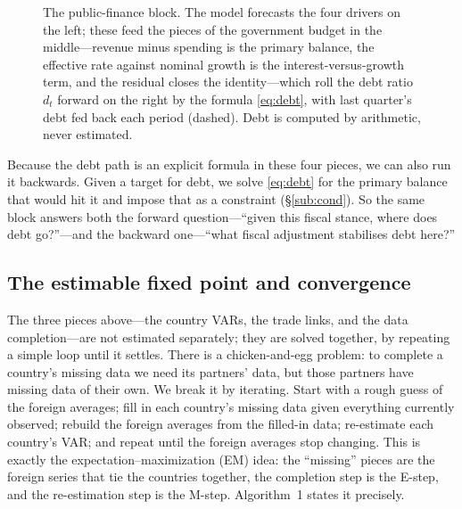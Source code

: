 \documentclass[11pt]{article}
\begin{document}
\begin{figure}[t]
\caption{The public-finance block. The model forecasts the four drivers on the left; these feed the pieces
of the government budget in the middle---revenue minus spending is the primary balance, the effective rate
against nominal growth is the interest-versus-growth term, and the residual closes the identity---which
roll the debt ratio $d_t$ forward on the right by the formula \eqref{eq:debt}, with last quarter's debt fed
back each period (dashed). Debt is computed by arithmetic, never estimated.}
\label{fig:fiscal}
\end{figure}

Because the debt path is an explicit formula in these four pieces, we can also run it backwards. Given a
target for debt, we solve \eqref{eq:debt} for the primary balance that would hit it and impose that as a
constraint (\S\ref{sub:cond}). So the same block answers both the forward question---``given this fiscal
stance, where does debt go?''---and the backward one---``what fiscal adjustment stabilises debt here?''

\subsection{The estimable fixed point and convergence}
\label{sub:fixedpoint}

The three pieces above---the country VARs, the trade links, and the data completion---are not estimated
separately; they are solved together, by repeating a simple loop until it settles. There is a
chicken-and-egg problem: to complete a country's missing data we need its partners' data, but those
partners have missing data of their own. We break it by iterating. Start with a rough guess of the
foreign averages; fill in each country's missing data given everything currently observed; rebuild the
foreign averages from the filled-in data; re-estimate each country's VAR; and repeat until the foreign
averages stop changing. This is exactly the expectation--maximization (EM) idea: the ``missing'' pieces
are the foreign series that tie the countries together, the completion step is the E-step, and the
re-estimation step is the M-step. Algorithm~1 states it precisely.
\end{document}
